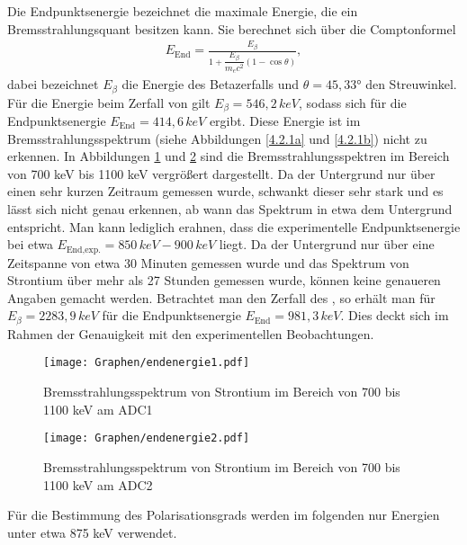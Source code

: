 \documentclass[twoside,colorback,accentcolor=tud4c,11pt]{tudreport}
\begin{document}
Die Endpunktsenergie bezeichnet die maximale Energie, die ein Bremsstrahlungsquant besitzen kann. Sie berechnet sich über die Comptonformel
\begin{align*}
E_{\text{End}}=\frac{E_{\beta}}{1+\dfrac{E_{\beta}}{m_ec^2}\left(1-\cos{\theta}\right)},
\end{align*}
dabei bezeichnet $E_{\beta}$ die Energie des Betazerfalls und $\theta=45,33$° den Streuwinkel. Für die Energie beim Zerfall von  gilt $E_{\beta}=546,2\,\si{keV}$, sodass sich für die Endpunktsenergie $E_{\text{End}}=414,6\,\si{keV}$ ergibt. Diese Energie ist im Bremsstrahlungsspektrum (siehe Abbildungen \ref{4.2.1a} und \ref{4.2.1b}) nicht zu erkennen. In Abbildungen \ref{4.2.1c} und \ref{4.2.1d} sind die Bremsstrahlungsspektren im Bereich von 700 keV bis 1100 keV vergrößert dargestellt. Da der Untergrund nur über einen sehr kurzen Zeitraum gemessen wurde, schwankt dieser sehr stark und es lässt sich nicht genau erkennen, ab wann das Spektrum in etwa dem Untergrund entspricht. Man kann lediglich erahnen, dass die experimentelle Endpunktsenergie bei etwa $E_{\text{End,exp.}}=850\,\si{keV} - 900\,\si{keV}$ liegt. Da der Untergrund nur über eine Zeitspanne von etwa 30 Minuten gemessen wurde und das Spektrum von Strontium über mehr als 27 Stunden gemessen wurde, können keine genaueren Angaben gemacht werden. Betrachtet man den Zerfall des , so erhält man für $E_{\beta}=2283,9\,\si{keV}$ für die Endpunktsenergie  $E_{\text{End}}=981,3\,\si{keV}$. Dies deckt sich im Rahmen der Genauigkeit mit den experimentellen Beobachtungen. 
\begin{figure}[H]
\centering
   	\begin{minipage}[b]{1\textwidth}
   	\texttt{[image: Graphen/endenergie1.pdf]}
   	\caption{Bremsstrahlungsspektrum von Strontium im Bereich von 700 bis 1100 keV am ADC1}
  	\label{4.2.1c}
   	\end{minipage}
\end{figure}  
\begin{figure}[H]
\centering
   	\begin{minipage}[b]{1\textwidth}
   	\texttt{[image: Graphen/endenergie2.pdf]}
   	\caption{Bremsstrahlungsspektrum von Strontium im Bereich von 700 bis 1100 keV am ADC2}
  	\label{4.2.1d}
   	\end{minipage}
\end{figure}
Für die Bestimmung des Polarisationsgrads werden im folgenden nur Energien unter etwa 875 keV verwendet.
\end{document}
